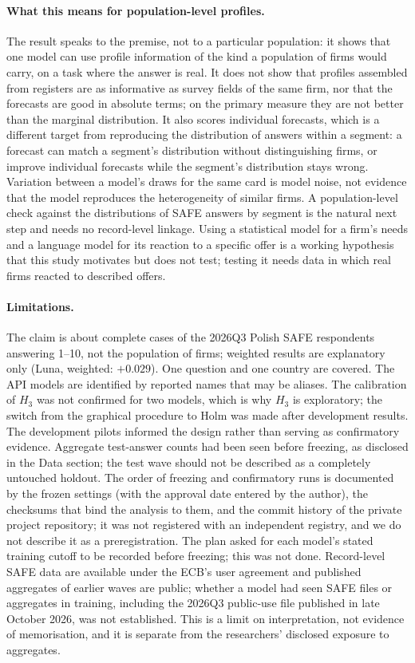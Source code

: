 \documentclass[11pt]{article}
\begin{document}
\paragraph{What this means for population-level profiles.} The result speaks to the premise, not to a particular
population: it shows that one model can use profile information of the kind a population of firms would carry, on a
task where the answer is real. It does not show that profiles assembled from registers are as informative as survey
fields of the same firm, nor that the forecasts are good in absolute terms; on the primary measure they are not
better than the marginal distribution. It also scores individual forecasts, which is a different target from
reproducing the distribution of answers within a segment: a forecast can match a segment's distribution without
distinguishing firms, or improve individual forecasts while the segment's distribution stays wrong. Variation between
a model's draws for the same card is model noise, not evidence that the model reproduces the heterogeneity of similar
firms. A population-level check against the distributions of SAFE answers by segment is the natural next step and needs
no record-level linkage. Using a statistical model for a firm's needs and a language model for its reaction to a
specific offer is a working hypothesis that this study motivates but does not test; testing it needs data in which
real firms reacted to described offers.

\paragraph{Limitations.} The claim is about complete cases of the 2026Q3 Polish SAFE respondents answering 1--10, not
the population of firms; weighted results are explanatory only (Luna, weighted: $+0.029$). One question and one country
are covered. The API models are identified by reported names that may be aliases. The calibration of $H_3$ was not
confirmed for two models, which is why $H_3$ is exploratory; the switch from the graphical procedure to Holm was made
after development results. The development pilots informed the design rather than serving as confirmatory evidence.
Aggregate test-answer counts had been seen before freezing, as disclosed in the Data section; the test wave should
not be described as a completely untouched holdout. The order of freezing and confirmatory runs is documented by the
frozen settings (with the approval date entered by the author), the checksums that bind the analysis to them, and the
commit history of the private project repository; it was not registered with an independent registry, and we do not
describe it as a preregistration. The plan asked for each model's stated training cutoff to be recorded before
freezing; this was not done. Record-level SAFE data are available under the ECB's user agreement and published
aggregates of earlier waves are public; whether a model had seen SAFE files or aggregates in training, including the
2026Q3 public-use file published in late October 2026, was not established. This is a limit on interpretation, not
evidence of memorisation, and it is separate from the researchers' disclosed exposure to aggregates.
\end{document}
